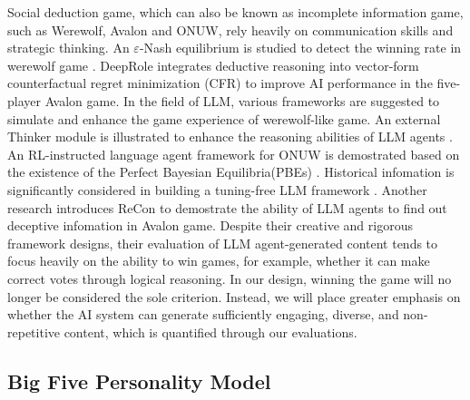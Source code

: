\documentclass[11pt]{article}
\begin{document}
Social deduction game, which can also be known as incomplete information game, such as Werewolf, Avalon and ONUW,  rely heavily on communication skills and strategic thinking. An $\varepsilon $-Nash equilibrium is studied to detect the winning rate in werewolf game \citep{bi2016human}. DeepRole \citep{serrino2019finding} integrates deductive reasoning into vector-form counterfactual regret minimization (CFR) to improve AI performance in the five-player Avalon game. In the field of LLM, various frameworks are suggested to simulate and enhance the game experience of werewolf-like game. An external Thinker module is illustrated to enhance the reasoning abilities of LLM agents \citep{wu2024enhance}. An RL-instructed language agent framework for ONUW is demostrated based on the existence of the Perfect Bayesian Equilibria(PBEs) \citep{jin2024learning}. Historical infomation is significantly considered in building a tuning-free LLM framework \citep{xu2023exploring}. Another research introduces ReCon to demostrate the ability of LLM agents to find out deceptive infomation in Avalon game. Despite their creative and rigorous framework designs, their evaluation of LLM agent-generated content tends to focus heavily on the ability to win games, for example, whether it can make correct votes through logical reasoning. In our design, winning the game will no longer be considered the sole criterion. Instead, we will place greater emphasis on whether the AI system can generate sufficiently engaging, diverse, and non-repetitive content, which is quantified through our evaluations.


\subsection{Big Five Personality Model} \label{sec:big_five_trait}
\end{document}
